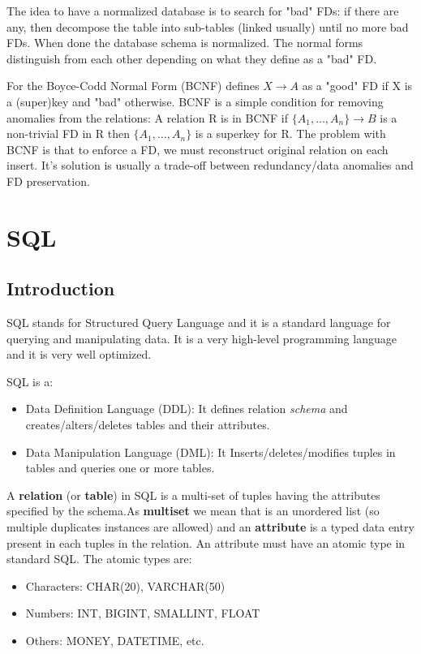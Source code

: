 \documentclass[a4page, 11pt]{article}
\theoremstyle{definition}
\begin{document}
The idea to have a normalized database is to search for "bad" FDs: if there are any, then decompose the table into sub-tables (linked usually) until no more bad FDs. When done the database schema is normalized. 
The normal forms distinguish from each other depending on what they define as a "bad" FD.

For the Boyce-Codd Normal Form (BCNF) defines $X \rightarrow A$ as a "good" FD if X is a (super)key and "bad" otherwise. 
BCNF is a simple condition for removing anomalies from the relations: A relation R is in BCNF if $\{A_1,\hdots,A_n\} \rightarrow B$ is a non-trivial FD in R then $\{A_1,\hdots,A_n\}$ is a superkey for R.\newline
The problem with BCNF is that to enforce a FD, we must reconstruct original relation on each insert. It's solution is usually a trade-off between redundancy/data anomalies and FD preservation.

\section{SQL}
\subsection{Introduction}
SQL stands for Structured Query Language and it is a standard language for querying and manipulating data. It is a very high-level programming language and it is very well optimized.


SQL is a:
\begin{itemize}[noitemsep]
	\item Data Definition Language (DDL):\newline
	 It defines relation \textit{schema} and creates/alters/deletes tables and their attributes.
	\item Data Manipulation Language (DML):\newline
	It Inserts/deletes/modifies tuples in tables and queries one or more tables.
\end{itemize}

A \textbf{relation} (or \textbf{table}) in SQL is a multi-set of tuples having the attributes specified by the schema.As \textbf{multiset} we mean that is an unordered list (so multiple duplicates instances are allowed) and an \textbf{attribute} is a typed data entry present in each tuples in the relation. An attribute must have an atomic type in standard SQL. The atomic types are:
\begin{itemize}[noitemsep]
	\item Characters: CHAR(20), VARCHAR(50)
	\item Numbers: INT, BIGINT, SMALLINT, FLOAT
	\item Others: MONEY, DATETIME, etc.
\end{itemize}
\end{document}
